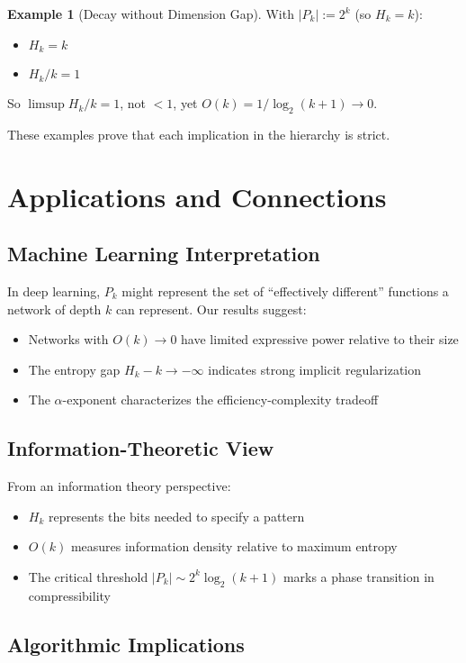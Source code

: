 \documentclass[11pt]{article}
\theoremstyle{definition}
\newtheorem{example}[theorem]{Example}
\begin{document}
\begin{example}[Decay without Dimension Gap]
With $|P_k|:=2^k$ (so $H_k = k$):
\begin{itemize}
\item $H_k = k$
\item $H_k/k = 1$
\end{itemize}
So $\limsup H_k/k=1$, not $<1$, yet $O(k) = 1/\log_2(k+1) \to 0$.
\end{example}

These examples prove that each implication in the hierarchy is strict.

\section{Applications and Connections}

\subsection{Machine Learning Interpretation}

In deep learning, $P_k$ might represent the set of ``effectively different'' functions a network of depth $k$ can represent. Our results suggest:
\begin{itemize}
\item Networks with $O(k)\to 0$ have limited expressive power relative to their size
\item The entropy gap $H_k-k\to-\infty$ indicates strong implicit regularization
\item The $\alpha$-exponent characterizes the efficiency-complexity tradeoff
\end{itemize}

\subsection{Information-Theoretic View}

From an information theory perspective:
\begin{itemize}
\item $H_k$ represents the bits needed to specify a pattern
\item $O(k)$ measures information density relative to maximum entropy
\item The critical threshold $|P_k|\sim 2^k\log_2(k+1)$ marks a phase transition in compressibility
\end{itemize}

\subsection{Algorithmic Implications}
\end{document}

